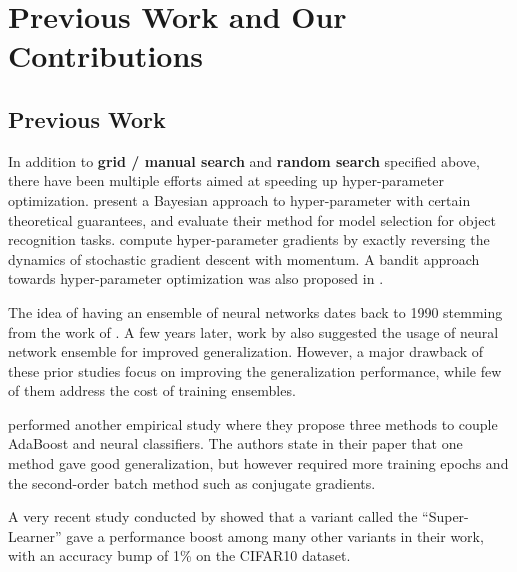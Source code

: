 \documentclass[12pt]{article}
\newcommand{\pbreak}{\vspace{4mm}}
\begin{document}
\section{Previous Work and Our Contributions}
\subsection{Previous Work}
\begin{flushleft}
In addition to \textbf{grid / manual search} and \textbf{random search} specified above, there have been multiple efforts aimed at speeding up hyper-parameter optimization. \citet{bayesian-hyp-opt} present a Bayesian approach to hyper-parameter with certain theoretical guarantees, and evaluate their method for model selection for object recognition tasks. \citet{grad-hyp-opt} compute hyper-parameter gradients by exactly reversing the dynamics of stochastic gradient descent with momentum. A bandit approach towards hyper-parameter optimization was also proposed in \citet{bandit-hyp-opt}.
\pbreak

The idea of having an ensemble of neural networks dates back to 1990 stemming from the work of \citet{tpami-ensemble-1990}. A few years later, work by \citet{nips-ensemble-1995} also suggested the usage of neural network ensemble for improved generalization. However, a major drawback of these prior studies focus on improving the generalization performance, while few of them address the cost of training ensembles.
\pbreak

\citet{nc-ensemble-2000} performed another empirical study where they propose three methods to couple AdaBoost and neural classifiers. The authors state in their paper that one method gave good generalization, but however required more training epochs and the second-order batch method such as conjugate gradients.
\pbreak

A very recent study conducted by \citet{arxiv-ensemble-2017} showed that a variant called the ``Super-Learner'' gave a performance boost among many other variants in their work, with an accuracy bump of 1\% on the CIFAR10 dataset.
\end{flushleft}
\end{document}
